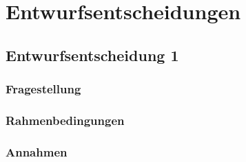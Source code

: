 \section{Entwurfsentscheidungen}
%
%
%
%
%

\subsection{Entwurfsentscheidung 1}

\subsubsection{Fragestellung}

\subsubsection{Rahmenbedingungen}

\subsubsection{Annahmen}


